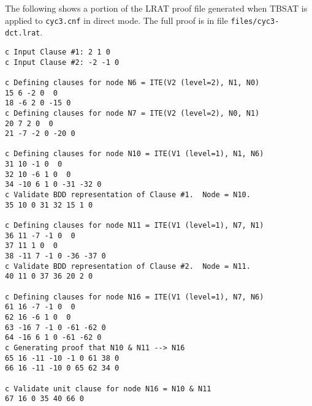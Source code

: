 \newpage
The following shows a portion of the LRAT proof file generated when TBSAT is applied to \texttt{cyc3.cnf} in direct mode.
The full proof is in file \texttt{files/cyc3-dct.lrat}.
\begin{lstlisting}
c Input Clause #1: 2 1 0
c Input Clause #2: -2 -1 0

c Defining clauses for node N6 = ITE(V2 (level=2), N1, N0)
15 6 -2 0  0
18 -6 2 0 -15 0
c Defining clauses for node N7 = ITE(V2 (level=2), N0, N1)
20 7 2 0  0
21 -7 -2 0 -20 0

c Defining clauses for node N10 = ITE(V1 (level=1), N1, N6)
31 10 -1 0  0
32 10 -6 1 0  0
34 -10 6 1 0 -31 -32 0
c Validate BDD representation of Clause #1.  Node = N10.
35 10 0 31 32 15 1 0

c Defining clauses for node N11 = ITE(V1 (level=1), N7, N1)
36 11 -7 -1 0  0
37 11 1 0  0
38 -11 7 -1 0 -36 -37 0
c Validate BDD representation of Clause #2.  Node = N11.
40 11 0 37 36 20 2 0

c Defining clauses for node N16 = ITE(V1 (level=1), N7, N6)
61 16 -7 -1 0  0
62 16 -6 1 0  0
63 -16 7 -1 0 -61 -62 0
64 -16 6 1 0 -61 -62 0
c Generating proof that N10 & N11 --> N16
65 16 -11 -10 -1 0 61 38 0
66 16 -11 -10 0 65 62 34 0

c Validate unit clause for node N16 = N10 & N11
67 16 0 35 40 66 0
\end{lstlisting}

\newpage

